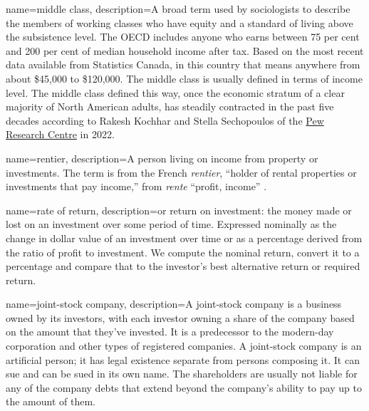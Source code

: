 {
name=middle class,
description={A broad term used by sociologists to describe the members of working classes who have equity and a standard of living above the subsistence level. The OECD includes anyone who earns between 75 per cent and 200 per cent of median household income after tax. Based on the most recent data available from Statistics Canada, in this country that means anywhere from about \$45,000 to \$120,000. The middle class is usually defined in terms of income level. The middle class defined this way, once the economic stratum of a clear majority of North American adults, has steadily contracted in the past five decades according to
Rakesh Kochhar and  Stella Sechopoulos of the \href{https://www.pewresearch.org/fact-tank/2022/04/20/how-the-american-middle-class-has-changed-in-the-past-five-decades/}{Pew Research Centre}  in 2022.}
}

{
name=rentier,
description={A person living on income from property or investments. The term is from the  French \textit{rentier}, ``holder of rental properties or investments that pay income,'' from \textit{rente} ``profit, income'' \cite{GET_rentier_defn_quote}. %
}
}

{
name=rate of return,
description={or return on investment: the money made or lost on an investment over some period of time. Expressed nominally as the change in dollar value of an investment over time or  as a percentage derived from the ratio of profit to investment. We compute the nominal return, convert it to a percentage and compare that to the investor's best alternative return or required return.}
}

{
name=joint-stock company,
description={A joint-stock company is a business owned by its investors, with each investor owning a share of the company based on the amount that they've invested. It is a predecessor to the modern-day corporation and other types of registered companies. A joint-stock company is an artificial person; it has legal existence separate from persons composing it. It can sue and can be sued in its own name. The shareholders are usually not liable for any of the company debts that extend beyond the company's ability to pay up to the amount of them.}
}

